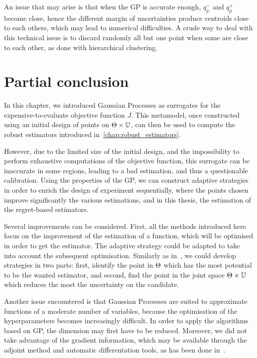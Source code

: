 \documentclass[../../Main_ManuscritThese.tex]{subfiles}
\begin{document}
An issue that may arise is that when the GP is accurate enough,
$q_p^-$ and $q_p^+$ become close, hence the different margin of
uncertainties produce centroids close to each others, which may lead
to numerical difficulties. A crude way to deal with this technical
issue is to discard randomly all but one point when some are close to
each other, as done with hierarchical clustering.

\section{Partial conclusion}

In this chapter, we introduced Gaussian Processes as surrogates for
the expensive-to-evaluate objective function $J$. This metamodel, once
constructed using an initial design of points on
$\Theta \times \mathbb{U}$, can then be used to compute the robust
estimators introduced in~\cref{chap:robust_estimators}.

However, due to the limited size of the initial design, and the
impossibility to perform exhaustive computations of the objective
function, this surrogate can be inaccurate in some regions, leading to
a bad estimation, and thus a questionable calibration.  Using the
properties of the GP, we can construct adaptive strategies in order
to enrich the design of experiment sequentially, where the points
chosen improve significantly the various estimations, and in this
thesis, the estimation of the regret-based estimators.

Several improvements can be considered. First, all the methods
introduced here focus on the improvement of the estimation of a
function, which will be optimised in order to get the estimator. The
adaptive strategy could be adapted to take into account the subsequent
optimisation. Similarly as in~\cite{janusevskis_simultaneous_2010}, we
could develop strategies in two parts: first, identify the point in
$\Theta$ which has the most potential to be the wanted estimator, and
second, find the point in the joint space $\Theta \times \mathbb{U}$
which reduces the most the uncertainty on the candidate.

Another issue encountered is that Gaussian Processes are suited to
approximate functions of a moderate number of variables, because the
optimisation of the hyperparameters becomes increasingly difficult. In
order to apply the algorithms based on GP, the dimension may first
have to be reduced. Moreover, we did not take advantage of the
gradient information, which may be available through the adjoint
method and automatic differentation tools, as has been done
in~\cite{bouhlel_gradient-enhanced_2019,laurent_overview_2019,miranda_adjoint-based_2016,pardalos_differentiating_2015}.
\end{document}
